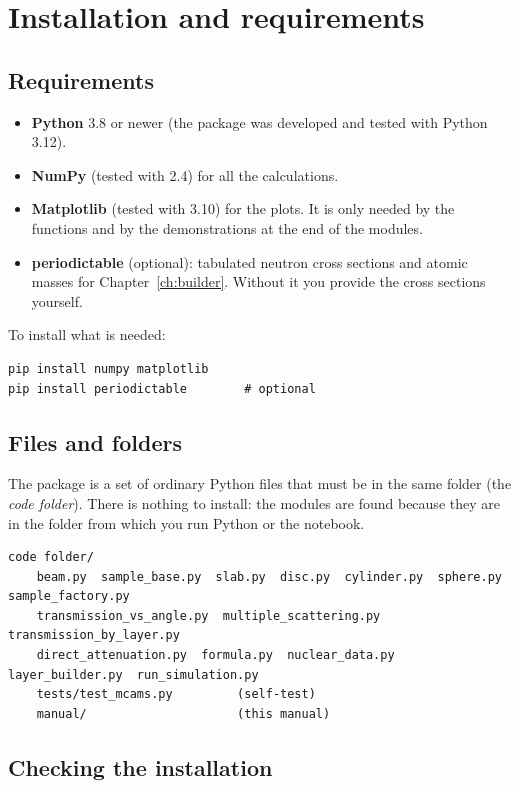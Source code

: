 \chapter{Installation and requirements}
\label{ch:install}

\section{Requirements}

\begin{itemize}
  \item \textbf{Python} 3.8 or newer (the package was developed and tested with Python 3.12).
  \item \textbf{NumPy} (tested with 2.4) for all the calculations.
  \item \textbf{Matplotlib} (tested with 3.10) for the plots. It is only needed by the 
        functions and by the demonstrations at the end of the modules.
  \item \textbf{periodictable} (optional): tabulated neutron cross sections and atomic masses for
        Chapter~\ref{ch:builder}. Without it you provide the cross sections yourself.
\end{itemize}
To install what is needed:
\begin{lstlisting}[style=shell]
pip install numpy matplotlib
pip install periodictable        # optional
\end{lstlisting}

\section{Files and folders}

The package is a set of ordinary Python files that must be in the same folder (the \emph{code folder}).
There is nothing to install: the modules are found because they are in the folder from which you run Python
or the notebook.
\begin{lstlisting}[style=shell]
code folder/
    beam.py  sample_base.py  slab.py  disc.py  cylinder.py  sphere.py  sample_factory.py
    transmission_vs_angle.py  multiple_scattering.py  transmission_by_layer.py
    direct_attenuation.py  formula.py  nuclear_data.py  layer_builder.py  run_simulation.py
    tests/test_mcams.py         (self-test)
    manual/                     (this manual)
\end{lstlisting}

\section{Checking the installation}

